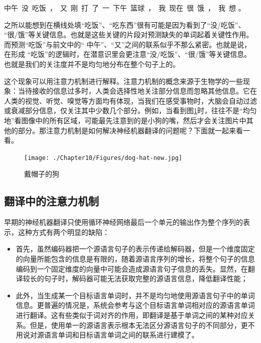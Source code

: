 \vspace{0.8em}
\centerline{中午\ 没\ 吃饭\ ，\ 又\ 刚\ 打\ 了\ 一\ 下午\ 篮球\ ，\ 我\ 现在\ 很\ 饿\ ，\ 我\ 想\underline{\quad \quad \quad} 。}
\vspace{0.8em}

\noindent 之所以能想到在横线处填“吃饭”、“吃东西”很有可能是因为看到了“没/吃饭”、 “很/饿”等关键信息。也就是这些关键的片段对预测缺失的单词起着关键性作用。而预测“吃饭”与前文中的“ 中午”、“又”之间的联系似乎不那么紧密。也就是说，在形成 “吃饭”的逻辑时，在潜意识里会更注意“没/吃饭”、“很/饿”等关键信息。也就是我们的关注度并不是均匀地分布在整个句子上的。

\parinterval 这个现象可以用注意力机制进行解释。注意力机制的概念来源于生物学的一些现象：当待接收的信息过多时，人类会选择性地关注部分信息而忽略其他信息。它在人类的视觉、听觉、嗅觉等方面均有体现，当我们在感受事物时，大脑会自动过滤或衰减部分信息，仅关注其中少数几个部分。例如，当看到图\ref{fig:10-16}时，往往不是“均匀地”看图像中的所有区域，可能最先注意到的是小狗的嘴，然后才会关注图片中其他的部分。那注意力机制是如何解决神经机器翻译的问题呢？下面就一起来看一看。

\begin{figure}[htp]
\centering
\texttt{[image: ./Chapter10/Figures/dog-hat-new.jpg]}
\caption{戴帽子的狗}
\label{fig:10-16}
\end{figure}

\subsection{翻译中的注意力机制}

\parinterval 早期的神经机器翻译只使用循环神经网络最后一个单元的输出作为整个序列的表示，这种方式有两个明显的缺陷：

\begin{itemize}
\vspace{0.5em}
\item 首先，虽然编码器把一个源语言句子的表示传递给解码器，但是一个维度固定的向量所能包含的信息是有限的，随着源语言序列的增长，将整个句子的信息编码到一个固定维度的向量中可能会造成源语言句子信息的丢失。显然，在翻译较长的句子时，解码器可能无法获取完整的源语言信息，降低翻译性能；
\vspace{0.5em}
\item 此外，当生成某一个目标语言单词时，并不是均匀地使用源语言句子中的单词信息。更普遍的情况是，系统会参考与这个目标语言单词相对应的源语言单词进行翻译。这有些类似于词对齐的作用，即翻译是基于单词之间的某种对应关系。但是，使用单一的源语言表示根本无法区分源语言句子的不同部分，更不用说对源语言单词和目标语言单词之间的联系进行建模了。
\vspace{0.5em}
\end{itemize}

